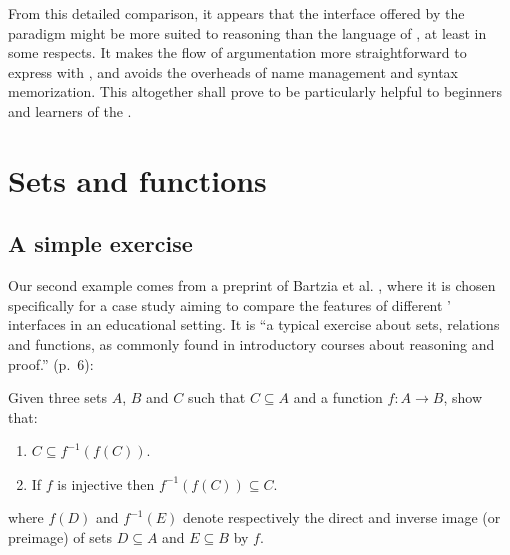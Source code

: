 From this detailed comparison, it appears that the interface offered by the
 paradigm might be more suited to  reasoning than the
 language of , at least in some respects. It makes the flow of
argumentation more straightforward to express with  , and avoids the
overheads of name management and syntax memorization. This altogether shall
prove to be particularly helpful to beginners and learners of the .


\section{Sets and functions}

\subsection{A simple exercise}

Our second example comes from a preprint of Bartzia et al.
, where it is chosen specifically for a case
study aiming to compare the features of different '
interfaces in an educational setting. It is ``a typical exercise about sets,
relations and functions, as commonly found in introductory courses about
reasoning and proof.'' (p.~6):

\begin{exercise}
  Given three sets $A$, $B$ and $C$ such that $C \subseteq A$ and a function $f
  : A \to B$, show that:
  \begin{enumerate}
    \item $C \subseteq f^{-1}(f(C))$.
    \item If $f$ is injective then $f^{-1}(f(C)) \subseteq C$.
  \end{enumerate}
  where $f(D)$ and $f^{-1}(E)$ denote respectively the direct and inverse image
  (or preimage) of sets $D \subseteq A$ and $E \subseteq B$ by $f$.
\end{exercise}

